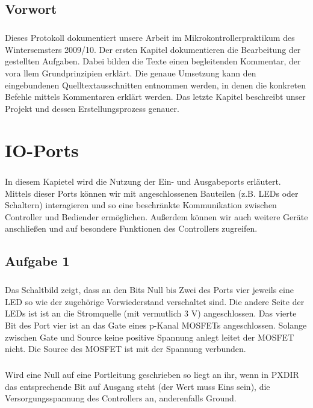 \section*{Vorwort}

\paragraph*{}
Dieses Protokoll dokumentiert unsere Arbeit im Mikrokontrollerpraktikum des Wintersemsters 2009/10. Der ersten Kapitel dokumentieren die Bearbeitung der gestellten Aufgaben. Dabei bilden die Texte einen begleitenden Kommentar, der vora llem Grundprinzipien erklärt. Die genaue Umsetzung kann den eingebundenen Quelltextausschnitten entnommen werden, in denen die konkreten Befehle mittels Kommentaren erklärt werden. Das letzte Kapitel beschreibt unser Projekt und dessen Erstellungsprozess genauer.

\chapter{IO-Ports}

\paragraph*{}
In diesem Kapietel wird die Nutzung der Ein- und Ausgabeports erläutert. Mittels dieser Ports können wir mit angeschlossenen Bauteilen (z.B. LEDs oder Schaltern) interagieren und so eine beschränkte Kommunikation zwischen Controller und Bediender ermöglichen. Außerdem können wir auch weitere Geräte anschließen und auf besondere Funktionen des Controllers zugreifen.

\section*{Aufgabe 1}

\paragraph*{}
Das Schaltbild zeigt, dass an den Bits Null bis Zwei des Ports vier 
jeweils eine LED so wie der zugehörige Vorwiederstand verschaltet sind. 
Die andere Seite der LEDs ist ist an die Stromquelle (mit vermutlich 3 V) 
angeschlossen. Das vierte Bit des Port vier ist an das Gate eines p-Kanal 
MOSFETs angeschlossen. Solange zwischen Gate und Source keine positive
Spannung anlegt leitet der MOSFET nicht. Die Source des MOSFET ist mit 
der Spannung verbunden.
\paragraph*{}
Wird eine Null auf eine Portleitung geschrieben so liegt an ihr, wenn in
PXDIR das entsprechende Bit auf Ausgang steht (der Wert muss Eins sein), 
die Versorgungsspannung des Controllers an, anderenfalls Ground.
